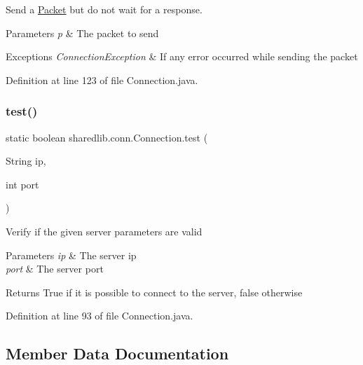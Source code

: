 Send a \hyperlink{classsharedlib_1_1conn_1_1_packet}{Packet} but do not wait for a response. 
\begin{DoxyParams}{Parameters}
{\em p} & The packet to send \\
\hline
\end{DoxyParams}

\begin{DoxyExceptions}{Exceptions}
{\em Connection\+Exception} & If any error occurred while sending the packet \\
\hline
\end{DoxyExceptions}


Definition at line 123 of file Connection.\+java.

\hypertarget{classsharedlib_1_1conn_1_1_connection_ace052367dd9ca3e1462baea961c9efda}{}\label{classsharedlib_1_1conn_1_1_connection_ace052367dd9ca3e1462baea961c9efda} 
\subsubsection{\texorpdfstring{test()}{test()}}
{\footnotesize\ttfamily static boolean sharedlib.\+conn.\+Connection.\+test (\begin{DoxyParamCaption}\item[{String}]{ip,  }\item[{int}]{port }\end{DoxyParamCaption})\hspace{0.3cm}{\ttfamily [static]}}

Verify if the given server parameters are valid 
\begin{DoxyParams}{Parameters}
{\em ip} & The server ip \\
\hline
{\em port} & The server port \\
\hline
\end{DoxyParams}
\begin{DoxyReturn}{Returns}
True if it is possible to connect to the server, false otherwise 
\end{DoxyReturn}


Definition at line 93 of file Connection.\+java.



\subsection{Member Data Documentation}
\hypertarget{classsharedlib_1_1conn_1_1_connection_aac9b160ef28ec9d71662318b969decb6}{}\label{classsharedlib_1_1conn_1_1_connection_aac9b160ef28ec9d71662318b969decb6} 

